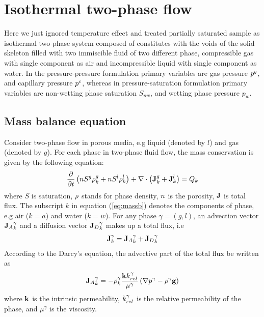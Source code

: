 \section{Isothermal two-phase flow}
\label{sec:isothermal two-phase} \hspace{0.25cm} Here we just
ignored temperature effect and treated partially saturated sample
as isothermal two-phase system composed of constitutes with the
voids of the solid skeleton filled with two immiscible fluid of
two different phase, compressible gas with single component as air
and incompressible liquid with single component as water. In the
pressure-pressure formulation primary variables are gas pressure
$p^g$, and capillary pressure $p^c$,
whereas in pressure-saturation formulation primary variables are
non-wetting phase saturation $S_{nw}$, and wetting phase pressure
$p_{w}$.
\subsection{Mass balance equation}
\hspace{0.25cm} Consider two-phase flow in porous media, e.g liquid (denoted by $l$) and gas (denoted by $g$). For each phase in two-phase fluid flow, the mass conservation is given by the following equation:
\begin{align}
\dfrac{\partial }{\partial t}\left(n S^g\rho_k^g+n S^l\rho_k^l\right)+\nabla \cdot \left( \mathbf{J}_k^g+\mathbf{J}_k^l\right)=Q_k
\label{eq:massb}
\end{align}
where $S$ is saturation, $\rho$ stands for phase density, $n$ is the porosity, $\mathbf{J}$ is total flux. The subscript $k$ in equation (\ref{eq:massb}) denotes the components of phase, e.g air ($k=a$) and water ($k=w$).
For any phase $\gamma=(g,l)$, an advection vector ${{\mathbf{J}}_A}_k^{\gamma}$ and a diffusion vector  ${{\mathbf{J}}_D}_k^{\gamma}$ makes up a total flux, i.e
\begin{align}
\mathbf{J}_k^{\gamma}={{\mathbf{J}}_A}_k^{\gamma}+{{\mathbf{J}}_D}_k^{\gamma}
\label{eq:tflx}
\end{align}
According to the Darcy's equation, the advective part of the total flux be written as
\begin{align}
{{\mathbf{J}}_A}_k^{\gamma}=-\rho_k^{\gamma}\dfrac{\mathbf k k_{rel}^{\gamma}}{\mu^{\gamma}}\left(\nabla p^{\gamma}-\rho^{\gamma} \mathbf g\right)
\label{eq:flx_dc}
\end{align}
where $\mathbf k$ is the intrinsic permeability, $k_{rel}^{\gamma}$ is the relative permeability of the phase, and $\mu^{\gamma}$ is the viscosity.

